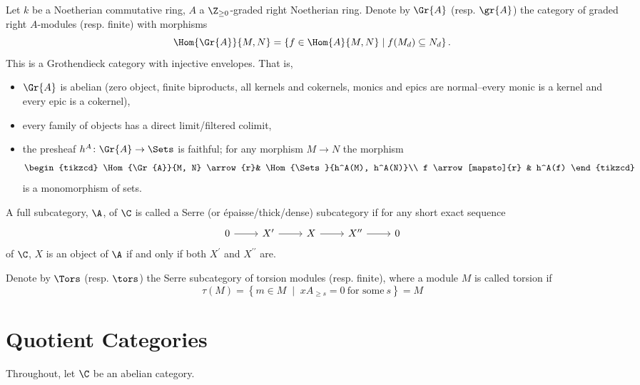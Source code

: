 Let $k$ be a Noetherian commutative ring, $A$ a $\Z_{\geq 0}$-graded right Noetherian ring.
Denote by $\Gr{A}$ (resp. $\gr{A}$) the category of graded right $A$-modules (resp. finite) with morphisms
$$\Hom{\Gr{A}}{M,N} = \left\{f \in \Hom{A}{M,N} \;\middle\vert\; f(M_d) \subseteq N_d\right\}.$$
This is a Grothendieck category with injective envelopes.
That is,
\begin{itemize}
\item
  $\Gr{A}$ is abelian (zero object, finite biproducts, all kernels and cokernels, monics and epics are normal--every monic is a kernel and every epic is a cokernel),
\item
  every family of objects has a direct limit/filtered colimit,
\item
  the presheaf $h^A \colon \Gr{A} \rightarrow \Sets$ is faithful; for any morphism $M \rightarrow N$ the morphism
  $$\begin{tikzcd}
    \Hom{\Gr{A}}{M, N} \arrow{r}& \Hom{\Sets}{h^A(M), h^A(N)}\\
    f \arrow[mapsto]{r} & h^A(f)
  \end{tikzcd}$$
  is a monomorphism of sets.
\end{itemize}

\begin{defn}
  A full subcategory, $\A$, of $\C$ is called a Serre (or \'{e}paisse/thick/dense) subcategory if for any short exact sequence
  $$\begin{tikzcd}
    0 \arrow{r} & X^\prime \arrow{r} & X \arrow{r} & X^{\prime\prime} \arrow{r} & 0
  \end{tikzcd}$$
  of $\C$, $X$ is an object of $\A$ if and only if both $X^\prime$ and $X^{\prime\prime}$ are.
\end{defn}

Denote by $\Tors$ (resp. $\tors$) the Serre subcategory of torsion modules (resp. finite), where a module $M$ is called torsion if
$$\tau(M) = \left\{m \in M \;\middle\vert\; xA_{\geq s} = 0\ \text{for some}\ s\right\} = M$$

\section{Quotient Categories}
Throughout, let $\C$ be an abelian category.

